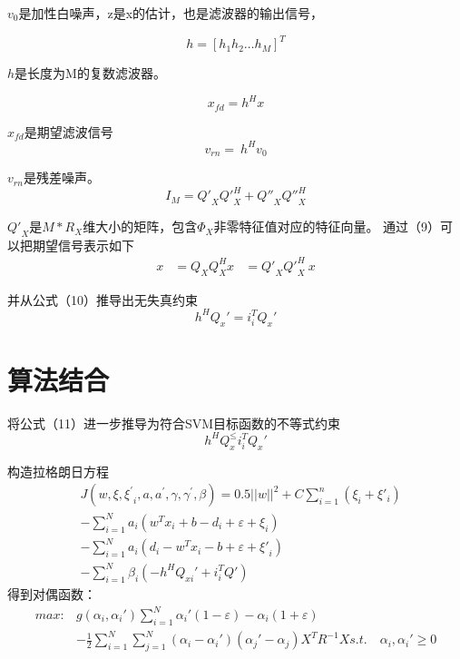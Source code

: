 $v_0$是加性白噪声，z是x的估计，也是滤波器的输出信号，

\begin{equation}
h=\left[h_1h_2\ldots h_M\right]^T
\end{equation}

$h$是长度为M的复数滤波器。

\begin{equation}
x_{fd}= h^Hx
\end{equation}

$x_{fd}$是期望滤波信号
\begin{equation}
v_{rn}=\ h^Hv_0
\end{equation}

$v_{rn}$是残差噪声。
\begin{equation}
I_M={Q'}_X{Q'}_X^H+{Q''}_X{Q''}_X^H
\end{equation}

${Q'}_X$是$M*R_X$维大小的矩阵，包含$\Phi_X$非零特征值对应的特征向量。
通过（9）可以把期望信号表示如下
\begin{equation}
\begin{aligned}
x&=Q_XQ_X^Hx
&={Q'}_X{Q'}_X^H\ x
\end{aligned}
\end{equation}

并从公式（10）推导出无失真约束
\begin{equation}
h^HQ_x'=i_i^TQ_x'
\end{equation}

\section{算法结合}
将公式（11）进一步推导为符合SVM目标函数的不等式约束
\begin{equation}
h^HQ_x^\le i_i^TQ_x'
\end{equation}

构造拉格朗日方程
\begin{equation}
\begin{aligned}
&J\left(w,\xi,{\xi^\prime}_i,a,a^\prime,\gamma,\gamma^\prime,\beta\right)=0.5||w||^2+C\sum\limits_{i=1}^{n}(\xi_i +\xi'_i)\\
&-\sum_{i=1}^{N}{a_i\left(w^Tx_i+b-d_i+\varepsilon+\xi_i\right)}\\
&-\sum_{i=1}^{N}{a_i\left(d_i-w^Tx_i-b+\varepsilon+{\xi'}_i\right)}\\
&-\sum_{i=1}^{N}{\beta_i\left(-h^HQ_{xi}'+i_i^TQ'\right)}
\end{aligned}
\end{equation}
得到对偶函数：
\begin{equation}
\begin{aligned}
max: &g(\alpha_i, \alpha _i{}')\sum_{i=1}^{N}\alpha _i{}'(1-\varepsilon )-\alpha_i(1+\varepsilon )\\
&-\frac{1}{2}\sum_{i=1}^{N}
\sum_{j=1}^{N}(\alpha_i-\alpha _i{}')(\alpha _j{}'-\alpha_j)X^{T}R^{-1}X
s.t.\quad \alpha_i, \alpha _i{}'\geq 0
\end{aligned}
\end{equation}

